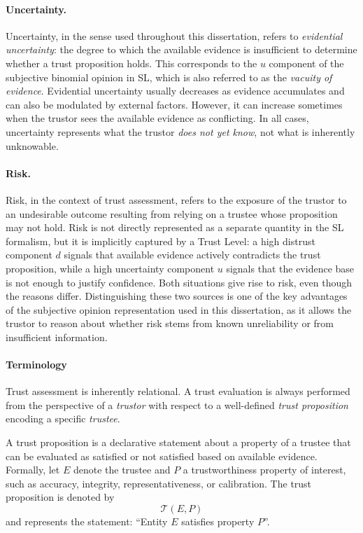 \paragraph{Uncertainty.}
Uncertainty, in the sense used throughout this dissertation, refers to \emph{evidential uncertainty}: the degree to which the available evidence is insufficient to determine whether a trust proposition holds. This corresponds to the $u$ component of the subjective binomial opinion in \ac{SL}, which is also referred to as the \emph{vacuity of evidence}. Evidential uncertainty usually decreases as evidence accumulates and can also be modulated by external factors. However, it can increase sometimes when the trustor sees the available evidence as conflicting. In all cases, uncertainty represents what the trustor \emph{does not yet know}, not what is inherently unknowable.

\paragraph{Risk.}
Risk, in the context of trust assessment, refers to the exposure of the trustor to an undesirable outcome resulting from relying on a trustee whose proposition may not hold. Risk is not directly represented as a separate quantity in the \ac{SL} formalism, but it is implicitly captured by a Trust Level: a high distrust component $d$ signals that available evidence actively contradicts the trust proposition, while a high uncertainty component $u$ signals that the evidence base is not enough to justify confidence. Both situations give rise to risk, even though the reasons differ. Distinguishing these two sources is one of the key advantages of the subjective opinion representation used in this dissertation, as it allows the trustor to reason about whether risk stems from known unreliability or from insufficient information.

\paragraph{Terminology}
Trust assessment is inherently relational. A trust evaluation is always performed from the perspective of a \emph{trustor} with respect to a well-defined \emph{trust proposition} encoding a specific \emph{trustee}.

\begin{definition}
A trust proposition is a declarative statement about a property of a trustee that can be evaluated as satisfied or not satisfied based on available evidence. Formally, let $E$ denote the trustee and $P$ a trustworthiness property of interest, such as accuracy, integrity, representativeness, or calibration. The trust proposition is denoted by
\[
\mathcal{T}(E, P)
\]
and represents the statement: ``Entity $E$ satisfies property $P$''.


\end{definition}

